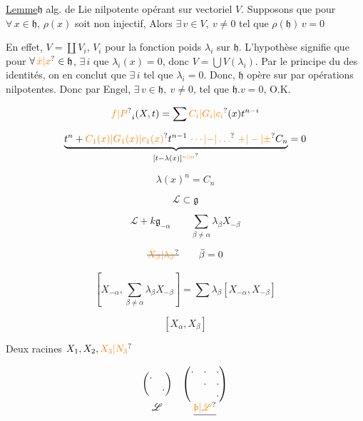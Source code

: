 
\uline{Lemme}\qquad $\mathfrak h$ alg. de Lie nilpotente  opérant sur
vectoriel $V$. Supposons que pour $\forall\,x\in\mathfrak h$, $\rho(x)$
soit non injectif, Alors $\exists\,v\in V,\ v\ne0$ tel que
$\rho(\mathfrak h)\,v=0$

En effet, $V=\coprod V_i$, $V_i$  pour la
fonction poids $\lambda_i$ sur $\mathfrak h$. L'hypothèse signifie
que pour $\forall\,\unsure{\dot x|x}\in\mathfrak h$, $\exists\,i$  que $\lambda_i(x)=0$,
donc $V=\bigcup V(\lambda_i)$. Par le principe du
 des identités, on en conclut que
$\exists\,i$ tel que $\lambda_i=0$. Donc, $\mathfrak h$ opère sur 
 par opérations nilpotentes. Donc
par Engel, $\exists\,v\in\mathfrak h,\ v\ne0$, tel que $\mathfrak h.v=0$, O.K.

\[
\unsure{f|P}_i(X,t)=\sum\unsure{C_i|G_i|c_i}(x)t^{n-i}
\]

\[
\underbrace{t^{n}+\unsure{C_1(x)|G_1(x)|c_1(x)}t^{n-1}\ \unsure{\cdots|{-}|\ldots}\ \unsure{+|-|\pm}C_n}_{[t-\lambda(x)]^{\unsure{n|m}}}=0
\]

\[
\lambda(x)^n=C_n
\]


\[
\mathscr L\subset\mathfrak g
\]

\[
\mathscr L+k\mathfrak g_{-\alpha}\qquad\sum_{\beta\ne\alpha}\lambda_\beta X_{-\beta}
\]

\[
\deleted{\unsure{X_\beta|\lambda_\beta}}\qquad\bar\beta=0
\]

\[
\left[X_{-\alpha},\sum_{\beta\ne\alpha}\lambda_\beta X_{-\beta}\right]
=\sum\lambda_\beta\left[X_{-\alpha},X_{-\beta}\right]
\]

\[
[X_\alpha,X_\beta]
\]

Deux racines \qquad $X_1,X_2,\unsure{X_3|N_3}$

\[
\begin{array}{cc}
\begin{pmatrix}\cdot&\\ &\cdot\end{pmatrix}
&
\begin{pmatrix}\cdot&\cdot&\cdot\\ &\cdot&\cdot\\ &&\cdot\end{pmatrix}\\[5pt]
\mathscr L & \deleted{\unsure{\mathfrak b|\mathscr L}}
\end{array}
\]

